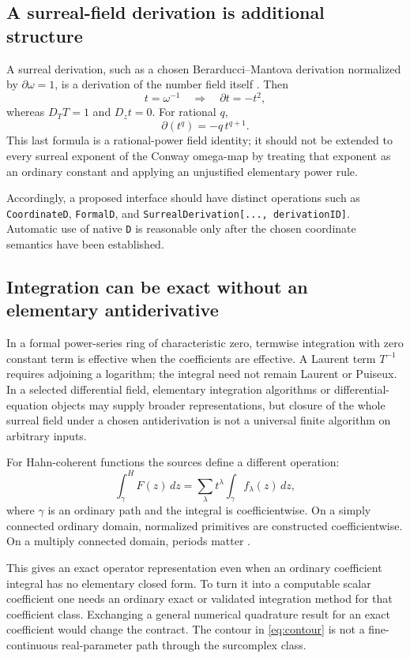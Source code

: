 \documentclass[11pt,letterpaper]{article}
\numberwithin{equation}{section}
\theoremstyle{definition}
\theoremstyle{remark}\newtheorem{remark}[theorem]{Remark}
\begin{document}
\subsection{A surreal-field derivation is additional structure}
A surreal derivation, such as a chosen Berarducci--Mantova derivation
normalized by $\partial\omega=1$, is a derivation of the number field itself
\cite{BMDerivations}. Then
\[
 t=\omega^{-1}\quad\Longrightarrow\quad \partial t=-t^2,
\]
whereas $D_TT=1$ and $D_zt=0$. For rational $q$,
\[
 \partial(t^q)=-q\,t^{q+1}.
\]
This last formula is a rational-power field identity; it should not be
extended to every surreal exponent of the Conway omega-map by treating that
exponent as an ordinary constant and applying an unjustified elementary
power rule.

Accordingly, a proposed interface should have distinct operations such as
\texttt{CoordinateD}, \texttt{FormalD}, and
\texttt{SurrealDerivation[..., derivationID]}. Automatic use of native
\texttt{D} is reasonable only after the chosen coordinate semantics have
been established.

\subsection{Integration can be exact without an elementary antiderivative}
In a formal power-series ring of characteristic zero, termwise integration
with zero constant term is effective when the coefficients are effective.
A Laurent term $T^{-1}$ requires adjoining a logarithm; the integral need
not remain Laurent or Puiseux. In a selected differential field, elementary
integration algorithms or differential-equation objects may supply broader
representations, but closure of the whole surreal field under a chosen
antiderivation is not a universal finite algorithm on arbitrary inputs.

For Hahn-coherent functions the sources define a different operation:
\begin{equation}\label{eq:contour}
 \int_\gamma^{H}F(z)\,dz
 =\sum_\lambda t^\lambda\int_\gamma f_\lambda(z)\,dz,
\end{equation}
where $\gamma$ is an ordinary path and the integral is coefficientwise.
On a simply connected ordinary domain, normalized primitives are constructed
coefficientwise. On a multiply connected domain, periods matter
\cite{SourceAnalysis}.

This gives an exact operator representation even when an ordinary coefficient
integral has no elementary closed form. To turn it into a computable scalar
coefficient one needs an ordinary exact or validated integration method for
that coefficient class. Exchanging a general numerical quadrature result for
an exact coefficient would change the contract. The contour in
\eqref{eq:contour} is not a fine-continuous real-parameter path through the
surcomplex class.
\end{document}
